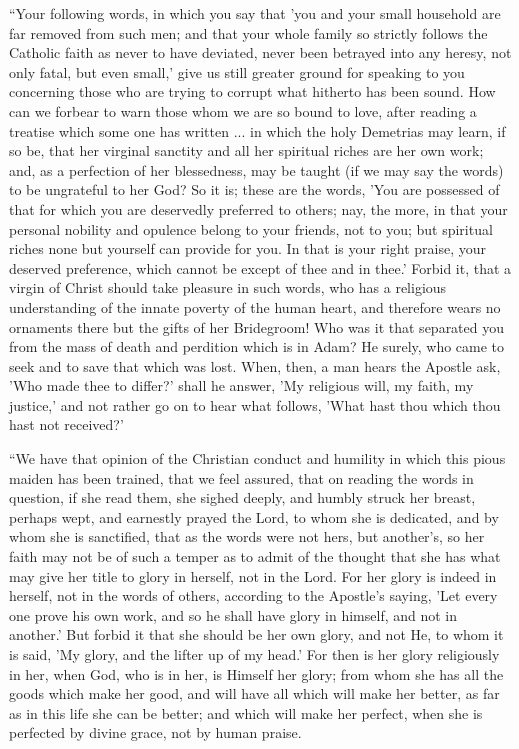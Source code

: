 ``Your following words, in which you say that 'you and your
small household are far removed from such men; and that your whole
family so strictly follows the Catholic faith as never to have
deviated, never been betrayed into any heresy, not only fatal, but
even small,' give us still greater ground for speaking to you
concerning those who are trying to corrupt what hitherto has been
sound. How can we forbear to warn those whom we are so bound to love,
after reading a treatise which some one has written ... in which the
holy Demetrias may learn, if so be, that her virginal sanctity and all
her spiritual riches are her own work; and, as a perfection of her
blessedness, may be taught (if we may say the words) to be ungrateful
to her God? So it is; these are the words, 'You are possessed of that
for which you are deservedly preferred to others; nay, the more, in
that your personal nobility and opulence belong to your friends, not
to you; but spiritual riches none but yourself can provide for you. In
that is your right praise, your deserved
preference, which cannot be except of thee and in thee.' Forbid it,
that a virgin of Christ should take pleasure in such words, who has a
religious understanding of the innate poverty of the human heart, and
therefore wears no ornaments there but the gifts of her Bridegroom!
Who was it that separated you from the mass of death and perdition
which is in Adam? He surely, who came to seek and to save that which
was lost. When, then, a man hears the Apostle ask, 'Who made thee to
differ?' shall he answer, 'My religious will, my faith, my justice,'
and not rather go on to hear what follows, 'What hast thou which thou
hast not received?'

``We have that opinion of the Christian conduct and humility in
which this pious maiden has been trained, that we feel assured, that
on reading the words in question, if she read them, she sighed deeply,
and humbly struck her breast, perhaps wept, and earnestly prayed the
Lord, to whom she is dedicated, and by whom she is sanctified, that as
the words were not hers, but another's, so her faith may not be of
such a temper as to admit of the thought that she has what may give
her title to glory in herself, not in the Lord. For her glory is
indeed in herself, not in the words of others, according to the
Apostle's saying, 'Let every one prove his own work, and so he shall
have glory in himself, and not in another.' But forbid it that she
should be her own glory, and not He, to whom it is said, 'My glory,
and the lifter up of my head.' For then is her glory religiously in
her, when God, who is in her, is Himself her glory; from whom she has
all the goods which make her good, and will have all which will make
her better, as far as in this life she can be better; and which will
make her perfect, when she is perfected by divine grace, not by human
praise.

